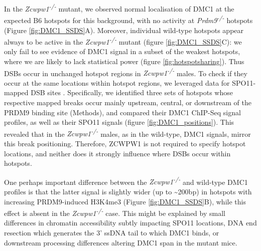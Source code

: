 In the \textit{Zcwpw1\textsuperscript{-/-}} mutant, we observed normal localisation of DMC1 at the expected B6 hotspots for this background, with no activity at \textit{Prdm9\textsuperscript{-/-}} hotspots (Figure \ref{fig:DMC1_SSDS}A).
Moreover, individual wild-type hotspots appear always to be active in the \textit{Zcwpw1\textsuperscript{-/-}} mutant (figure \ref{fig:DMC1_SSDS}C): we only fail to see evidence of DMC1 signal in a subset of the weakest hotspots, where we are likely to lack statistical power (figure \ref{fig:hotspotsharing}).
Thus DSBs occur in unchanged hotspot regions in \textit{Zcwpw1\textsuperscript{-/-}} males.
To check if they occur at the same locations within hotspot regions, we leveraged data for SPO11-mapped DSB sites \parencite{Lange2016Landscape}.
Specifically, we identified three sets of hotspots whose respective mapped breaks occur mainly upstream, central, or downstream of the PRDM9 binding site (Methods), and compared their DMC1 ChIP-Seq signal profiles, as well as their SPO11 signals (figure \ref{fig:DMC1_positions}).
This revealed that in the \textit{Zcwpw1\textsuperscript{-/-}} males, as in the wild-type, DMC1 signals, mirror this break positioning.
Therefore, ZCWPW1 is not required to specify hotspot locations, and neither does it strongly influence where DSBs occur within hotspots.

One perhaps important difference between the \textit{Zcwpw1\textsuperscript{-/-}} and wild-type DMC1 profiles is that the latter signal is slightly wider (up to \textasciitilde200bp) in hotspots with increasing PRDM9-induced H3K4me3 (Figure \ref{fig:DMC1_SSDS}B), while this effect is absent in the \textit{Zcwpw1\textsuperscript{-/-}} case.
This might be explained by small differences in chromatin accessibility subtly impacting SPO11 locations, DNA end resection which generates the 3’ ssDNA tail to which DMC1 binds, or downstream processing differences altering DMC1 span in the mutant mice.

